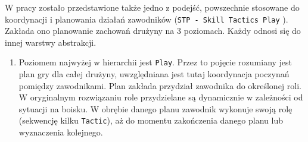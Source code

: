 W pracy zostało przedstawione także jedno z podejść, powszechnie stosowane do koordynacji i planowania działań zawodników (\mbox{\texttt{STP - Skill Tactics Play}} \cite{stp}).
Zakłada ono planowanie zachowań drużyny na $3$ poziomach. Każdy odnosi się do innej warstwy abstrakcji.
\begin{enumerate} 
  \item Poziomem najwyżej w hierarchii jest \texttt{Play}. Przez to pojęcie rozumiany jest plan gry dla całej drużyny, uwzględniana jest tutaj koordynacja
  poczynań pomiędzy zawodnikami. Plan zakłada przydział zawodnika do określonej roli. W oryginalnym rozwiązaniu role przydzielane są dynamicznie w zależności od sytuacji na boisku.
  W obrębie danego planu zawodnik wykonuje swoją rolę (sekwencję kilku \texttt{Tactic}), aż do momentu zakończenia danego planu lub wyznaczenia kolejnego.
  

\end{enumerate}
